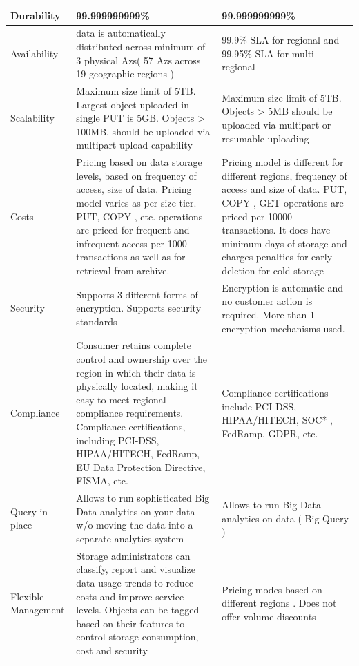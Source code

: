 \begin{longtable}{p{3.7cm}|p{3.7cm}|p{3.7cm}}
{Durability} & {99.999999999\%} & {99.999999999\%} \\ %
\hline
{Availability} & {data is automatically distributed across minimum of 3 physical Azs( 57 Azs across 19 geographic regions )} & {99.9\% SLA for regional and 99.95\% SLA for multi-regional} \\
\hline
{Scalability} & {Maximum size limit of 5TB. Largest object uploaded in single PUT is 5GB. Objects > 100MB, should be uploaded via multipart upload capability} & {Maximum size limit of 5TB. Objects > 5MB should be uploaded via multipart or resumable uploading} \\
\hline
{Costs} & {Pricing based on data storage levels, based on frequency of access, size of data. Pricing model varies as per size tier. PUT, COPY , etc. operations are priced for frequent and infrequent access per 1000 transactions  as well as for retrieval from archive.} & {Pricing model is different for different regions, frequency of access and size of data. PUT, COPY , GET operations are priced per 10000 transactions. It does have minimum days of storage and charges penalties for early deletion for cold storage} \\
\hline
{Security} & {Supports 3 different forms of encryption. Supports security standards} & {Encryption is automatic and no customer action is required. More than 1 encryption mechanisms used.} \\ 
\hline
{Compliance} & {Consumer retains complete control and ownership over the region in which their data is physically located, making it easy to meet regional compliance requirements. Compliance certifications, including PCI-DSS, HIPAA/HITECH, FedRamp, EU Data Protection Directive, FISMA, etc.} & {Compliance certifications include PCI-DSS, HIPAA/HITECH, SOC* , FedRamp, GDPR,  etc.}\\
\hline
{Query in place} & {Allows to run sophisticated Big Data analytics on your data w/o moving the data into a separate analytics system} & {Allows to run Big Data analytics on data ( Big Query )} \\
\hline
{Flexible Management} & {Storage administrators can classify, report and visualize data usage trends to reduce costs and improve service levels. Objects can be tagged based on their features to control storage consumption, cost and security} & {Pricing modes based on different regions . Does not offer volume discounts} \\

\end{longtable}

